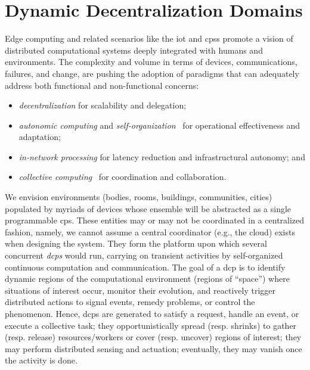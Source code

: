 \chapter{Dynamic Decentralization Domains} %
\minitoc%
Edge computing
 and related scenarios
 like the \ac{iot} and \acp{cps}
 promote a vision of
 distributed computational systems 
 deeply integrated with
 humans and environments.
% 
%
The complexity and volume in terms of devices, communications, failures, and change,
 are pushing the adoption of paradigms 
 that can %
 adequately address both functional
 and non-functional concerns:
\begin{itemize}
  \item \emph{decentralization} for scalability and delegation;
  \item \emph{autonomic computing} and \emph{self-organization}~\cite{DBLP:journals/computer/KephartC03} for operational effectiveness and adaptation;
  \item \emph{in-network processing} for latency reduction and infrastructural autonomy; and
  \item \emph{collective computing}~\cite{DBLP:journals/eaai/CasadeiVAPD21} for coordination and collaboration.
\end{itemize}

We envision environments (bodies, rooms, buildings, communities, cities)
 populated by myriads of devices
 whose ensemble will be abstracted as a single programmable \ac{cps}.
%
These entities may or may not be coordinated in a centralized fashion,
namely,
we cannot assume a central coordinator (e.g., the cloud) exists when designing the system.
%
They form the platform %
 upon which several concurrent
 \emph{\acp{dcp}} 
 would run, carrying on transient activities
 by self-organized continuous computation and communication. %
%
The goal of a \ac{dcp} is to identify dynamic regions of the computational environment (regions of ``space'') where
situations of interest occur,
monitor their evolution,
and reactively trigger distributed actions to signal events,
remedy problems,
or control the phenomenon.
%
Hence, \acp{dcp}
 are generated
 to satisfy a request,
 handle an event, or 
 execute a collective task;
 they opportunistically spread (resp. shrinks)
 to gather (resp. release) resources/workers
 or cover (resp. uncover) regions of interest;
 they may perform 
 distributed sensing and actuation;
eventually, they may vanish once the activity is done.
 

